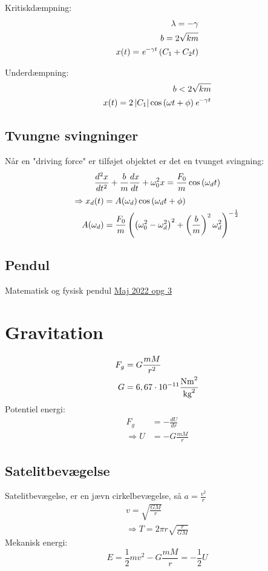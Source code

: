 \documentclass[a4paper,oneside,article]{memoir}
\begin{document}
Kritiskdæmpning: 
\begin{align*}
    \lambda = -\gamma \\
    b = 2\sqrt{km} \\
    x(t) = \e{-\gamma t}\br{C_1+C_2t}
\end{align*}

Underdæmpning: 
\begin{align*}
    b < 2\sqrt{km} \\
    x(t) = 2\br[5]{C_1}\cos\br{\omega t+\phi}\e{-\gamma t}
\end{align*}

\newpage
\subsection{Tvungne svingninger} \label{ssc:tvungne}
Når en "driving force" er tilføjet objektet er det en tvunget svingning: 
\[\frac{d^2x}{dt^2}+\frac{b}{m}\frac{dx}{dt}+\omega_0^2x = \frac{F_0}{m} \cos\br{\omega_dt} \]
\begin{align*}
    \Rightarrow x_d(t) &= A(\omega_d)\cos\br{\omega_d t+\phi}\\
    A(\omega_d) &= \frac{F_0}{m}\br{\br{\omega_0^2-\omega_d^2}^2+\br{\frac{b}{m}}^2\omega_d^2}^{-\frac{1}{2}}
\end{align*}

\subsection{Pendul}
Matematisk og fysisk pendul 
\hyperref[asc:Maj 2022 opg 3]{Maj 2022 opg 3}

\section{Gravitation} \label{sc:gravitation}
\begin{align*}
    F_g &= G\frac{mM}{r^2} \\
    G &= 6,67\cdot 10^{-11} \frac{\text{Nm}^2}{\text{kg}^2}
\end{align*}
Potentiel energi: 
\begin{align*}
    F_g &= -\frac{dU}{dr} \\
    \Rightarrow U &= -G\frac{mM}{r}
\end{align*}

\subsection{Satelitbevægelse} \label{ssc:satelitbevægelse}
Satelitbevægelse, er en jævn cirkelbevægelse, så $a=\frac{v^2}{r}$
\begin{align*}
    v = \sqrt{\frac{GM}{r}} \\
    \Rightarrow T = 2\pi r\sqrt{\frac{r}{GM}}
\end{align*}
Mekanisk energi: \[E = \frac{1}{2}mv^2-G\frac{mM}{r} = -\frac{1}{2}U\]
\end{document}
